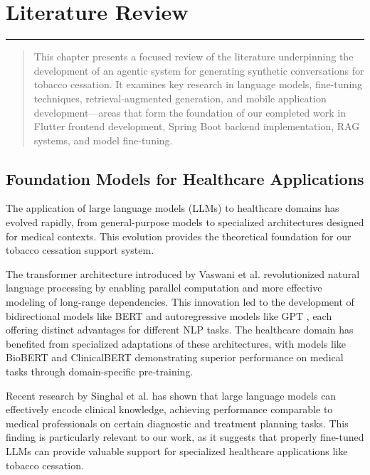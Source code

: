 
\chapter{Literature Review} %
\label{Chapter3} %

\begin{center}
\rule{0.5\textwidth}{0.5pt}
\end{center}

\begin{quotation}
This chapter presents a focused review of the literature underpinning the development of an agentic system for generating synthetic conversations for tobacco cessation. It examines key research in language models, fine-tuning techniques, retrieval-augmented generation, and mobile application development—areas that form the foundation of our completed work in Flutter frontend development, Spring Boot backend implementation, RAG systems, and model fine-tuning.
\end{quotation}

\section{Foundation Models for Healthcare Applications}
\begin{tcolorbox}[colback=gray!5!white,colframe=gray!75!black,title=Evolution of Language Models in Healthcare]
The application of large language models (LLMs) to healthcare domains has evolved rapidly, from general-purpose models to specialized architectures designed for medical contexts. This evolution provides the theoretical foundation for our tobacco cessation support system.
\end{tcolorbox}

The transformer architecture introduced by Vaswani et al. \cite{Vaswani} revolutionized natural language processing by enabling parallel computation and more effective modeling of long-range dependencies. This innovation led to the development of bidirectional models like BERT \cite{BERT} and autoregressive models like GPT \cite{GPT}, each offering distinct advantages for different NLP tasks. The healthcare domain has benefited from specialized adaptations of these architectures, with models like BioBERT \cite{BioBERT} and ClinicalBERT \cite{ClinicalBERT} demonstrating superior performance on medical tasks through domain-specific pre-training.

Recent research by Singhal et al. \cite{MedicalLLMFineTuning} has shown that large language models can effectively encode clinical knowledge, achieving performance comparable to medical professionals on certain diagnostic and treatment planning tasks. This finding is particularly relevant to our work, as it suggests that properly fine-tuned LLMs can provide valuable support for specialized healthcare applications like tobacco cessation.

